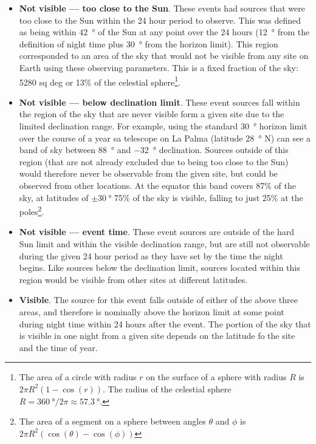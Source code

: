 \begin{colsection}
\begin{colsection}
\begin{itemize}
    \item \textbf{Not visible --- too close to the Sun}. These events had sources that were too close to the Sun within the 24 hour period to observe. This was defined as being within \SI{42}{\degree} of the Sun at any point over the 24 hours (\SI{12}{\degree} from the definition of night time plus \SI{30}{\degree} from the horizon limit). This region corresponded to an area of the sky that would not be visible from any site on Earth using these observing parameters. This is a fixed fraction of the sky: 5280 sq deg or 13\% of the celestial sphere\footnote{The area of a circle with radius $r$ on the surface of a sphere with radius $R$ is $2\pi R^2(1-\cos(r))$. The radius of the celestial sphere $R=\SI{360}{\degree}/2\pi \approx \SI{57.3}{\degree}$.}.

    \item \textbf{Not visible --- below declination limit}. These event sources fall within the region of the sky that are never visible form a given site due to the limited declination range. For example, using the standard \SI{30}{\degree} horizon limit over the course of a year sa telescope on La Palma (latitude \SI{28}{\degree} N) can see a band of sky between \SI{+88}{\degree} and \SI{-32}{\degree} declination. Sources outside of this region (that are not already excluded due to being too close to the Sun) would therefore never be observable from the given site, but could be observed from other locations. At the equator this band covers 87\% of the sky, at latitudes of $\pm \SI{30}{\degree}$ 75\% of the sky is visible, falling to just 25\% at the poles\footnote{The area of a segment on a sphere between angles $\theta$ and $\phi$ is $2 \pi R^2 (\cos(\theta)-\cos(\phi))$}.

    \item \textbf{Not visible --- event time}. These event sources are outside of the hard Sun limit and within the visible declination range, but are still not observable during the given 24 hour period as they have set by the time the night begins. Like sources below the declination limit, sources located within this region would be visible from other sites at different latitudes.

    \item \textbf{Visible}. The source for this event falls outside of either of the above three areas, and therefore is nominally above the horizon limit at some point during night time within 24 hours after the event. The portion of the sky that is visible in one night from a given site depends on the latitude fo the site and the time of year.
\end{itemize}


\end{colsection}
\end{colsection}
